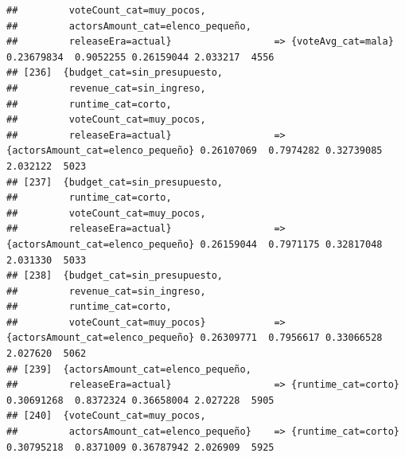 \documentclass[
]{article}
\begin{document}
\begin{verbatim}
##         voteCount_cat=muy_pocos,                                                                                                
##         actorsAmount_cat=elenco_pequeño,                                                                                        
##         releaseEra=actual}                  => {voteAvg_cat=mala}                0.23679834  0.9052255 0.26159044 2.033217  4556
## [236]  {budget_cat=sin_presupuesto,                                                                                             
##         revenue_cat=sin_ingreso,                                                                                                
##         runtime_cat=corto,                                                                                                      
##         voteCount_cat=muy_pocos,                                                                                                
##         releaseEra=actual}                  => {actorsAmount_cat=elenco_pequeño} 0.26107069  0.7974282 0.32739085 2.032122  5023
## [237]  {budget_cat=sin_presupuesto,                                                                                             
##         runtime_cat=corto,                                                                                                      
##         voteCount_cat=muy_pocos,                                                                                                
##         releaseEra=actual}                  => {actorsAmount_cat=elenco_pequeño} 0.26159044  0.7971175 0.32817048 2.031330  5033
## [238]  {budget_cat=sin_presupuesto,                                                                                             
##         revenue_cat=sin_ingreso,                                                                                                
##         runtime_cat=corto,                                                                                                      
##         voteCount_cat=muy_pocos}            => {actorsAmount_cat=elenco_pequeño} 0.26309771  0.7956617 0.33066528 2.027620  5062
## [239]  {actorsAmount_cat=elenco_pequeño,                                                                                        
##         releaseEra=actual}                  => {runtime_cat=corto}               0.30691268  0.8372324 0.36658004 2.027228  5905
## [240]  {voteCount_cat=muy_pocos,                                                                                                
##         actorsAmount_cat=elenco_pequeño}    => {runtime_cat=corto}               0.30795218  0.8371009 0.36787942 2.026909  5925

\end{verbatim}
\end{document}
